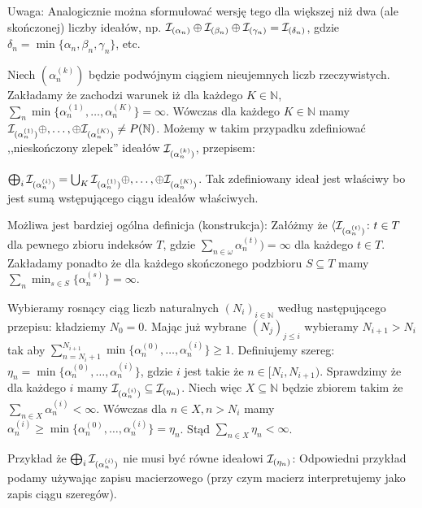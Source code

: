 \documentclass[12pt]{article}
\theoremstyle{plain}
\theoremstyle{definition}
\theoremstyle{remark}
\newcommand{\nnatural}{\mathbb{N}}
\newcommand{\cI}{{\cal I}}
\begin{document}
Uwaga: Analogicznie można sformułować wersję tego dla większej
niż dwa (ale skończonej) liczby ideałów, np. 
$\cI_{(\alpha_n)} \oplus \cI_{(\beta_n)} \oplus \cI_{(\gamma_n)} = \cI_{(\delta_n)}$,
gdzie $\delta_n = \min\{\alpha_n,\beta_n, \gamma_n\}$, etc.

Niech $(\alpha_n^{(k)})$ będzie podwójnym ciągiem nieujemnych liczb
rzeczywistych. Zakładamy że zachodzi warunek
iż dla każdego $K \in \nnatural$, 
$\sum_n \min \{\alpha_n^{(1)}, \ldots, \alpha_n^{(K)}\} = \infty$.
Wówczas dla każdego $K \in \nnatural$ mamy
$\cI_{(\alpha_n^{(1)})} \oplus,\ldots,\oplus \cI_{(\alpha_n^{(K)})} \not= P(\nnatural)$.
Możemy w takim przypadku zdefiniować ,,nieskończony zlepek'' ideałów 
$\cI_{(\alpha_n^{(k)})}$, przepisem:			 
	
$\bigoplus_{i}\cI_{(\alpha_n^{(i)})} = \bigcup_{K} \cI_{(\alpha_n^{(1)})} \oplus,\ldots,\oplus \cI_{(\alpha_n^{(K)})}$.
Tak zdefiniowany ideał jest właściwy bo jest sumą wstępującego ciągu ideałów właściwych.

Możliwa jest bardziej ogólna 
definicja (konstrukcja): 
Załóżmy że 
$\langle \cI_{(\alpha_n^{(t)})}
\colon t \in T
$ dla pewnego zbioru indeksów
$T$, gdzie 
$\sum_{n\in\omega}\alpha_n^{(t)}) = \infty$ dla każdego $t\in T$.
Zakładamy ponadto że 
dla każdego skończonego podzbioru
$S \subseteq T$ mamy
$\sum_n \min_{s\in S}
\{\alpha_n^{(s)}\} = \infty$.

Wybieramy rosnący ciąg liczb naturalnych $(N_i)_{i\in\nnatural}$ według następującego przepisu: kładziemy $N_0 = 0$. Mając już wybrane $(N_j)_{j \leq i}$
wybieramy $N_{i + 1} > N_{i}$ tak aby $\sum_{n = N_{i} + 1}^{N_{i+1}} \min\{\alpha_n^{(0)} , \ldots, \alpha_n^{(i)} \} \geq 1$.
Definiujemy szereg: $\eta_n = \min\{\alpha_n^{(0)} , \ldots, \alpha_n^{(i)}\}$, gdzie $i$ jest
takie że $n \in [N_i, N_{i+1})$. Sprawdzimy że dla każdego $i$ mamy 
$\cI_{(\alpha_n^{(i)})} \subseteq \cI_{(\eta_n)}$.				
Niech więc $X \subseteq \nnatural$ będzie zbiorem takim że 
$\sum_{n\in X} \alpha_n^{(i)} < \infty$. Wówczas dla $n\in X, n > N_i$ mamy
$\alpha_n^{(i)} \geq \min\{\alpha_n^{(0)} , \ldots, \alpha_n^{(i)}\} = \eta_n$.
Stąd $\sum_{n\in X}\eta_n < \infty$.

Przykład że $\bigoplus_{i}\cI_{(\alpha_n^{(i)})}$ nie musi być
równe ideałowi $\cI_{(\eta_n)}$: 
Odpowiedni przykład podamy używając zapisu macierzowego
(przy czym macierz interpretujemy jako zapis ciągu szeregów).
	
\end{document}
